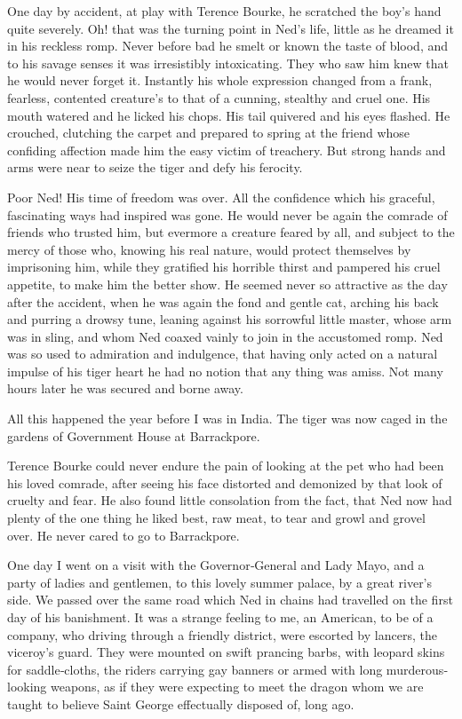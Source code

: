 \documentclass[12pt]{book}
\begin{document}
One day by accident, at play with Terence Bourke, he scratched the boy’s
hand quite severely. Oh! that was the turning point in Ned’s life, little as he
dreamed it in his reckless romp. Never before bad he smelt or known the taste of
blood, and to his savage senses it was irresistibly intoxicating. They who saw him
knew that he would never forget it. Instantly his whole expression changed from
a frank, fearless, contented creature’s to that of a cunning, stealthy and cruel one.
His mouth watered and he licked his chops. His tail quivered and his eyes flashed.
He crouched, clutching the carpet and prepared to spring at the friend whose
confiding affection made him the easy victim of treachery. But strong hands and
arms were near to seize the tiger and defy his ferocity.

Poor Ned! His time of freedom was over. All the confidence which his graceful,
fascinating ways had inspired was gone. He would never be again the comrade
of friends who trusted him, but evermore a creature feared by all, and subject to
the mercy of those who, knowing his real nature, would protect themselves by
imprisoning him, while they gratified his horrible thirst and pampered his cruel
appetite, to make him the better show. He seemed never so attractive as the day
after the accident, when he was again the fond and gentle cat, arching his back
and purring a drowsy tune, leaning against his sorrowful little master, whose arm
was in sling, and whom Ned coaxed vainly to join in the accustomed romp. Ned
was so used to admiration and indulgence, that having only acted on a natural
impulse of his tiger heart he had no notion that any thing was amiss. Not many
hours later he was secured and borne away.

All this happened the year before I was in India. The tiger was now caged in
the gardens of Government House at Barrackpore.

Terence Bourke could never endure the pain of looking at the pet who had
been his loved comrade, after seeing his face distorted and demonized by that
look of cruelty and fear. He also found little consolation from the fact, that Ned
now had plenty of the one thing he liked best, raw meat, to tear and growl and
grovel over. He never cared to go to Barrackpore.

One day I went on a visit with the Governor‐General and Lady Mayo, and a
party of ladies and gentlemen, to this lovely summer palace, by a great river’s
side. We passed over the same road which Ned in chains had travelled on the
first day of his banishment. It was a strange feeling to me, an American, to be
of a company, who driving through a friendly district, were escorted by lancers,
the viceroy’s guard. They were mounted on swift prancing barbs, with leopard
skins for saddle‐cloths, the riders carrying gay banners or armed with long
murderous‐looking weapons, as if they were expecting to meet the dragon whom
we are taught to believe Saint George effectually disposed of, long ago.
\end{document}
